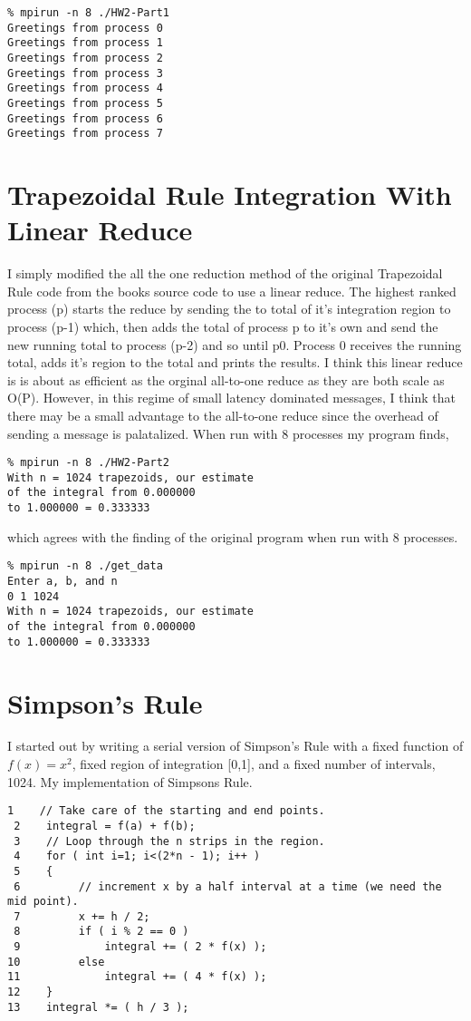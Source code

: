 \documentclass{IEEEtran}
\begin{document}
\begin{verbatim}
% mpirun -n 8 ./HW2-Part1  
Greetings from process 0 
Greetings from process 1 
Greetings from process 2 
Greetings from process 3 
Greetings from process 4 
Greetings from process 5 
Greetings from process 6 
Greetings from process 7
\end{verbatim}

\section{Trapezoidal Rule Integration With Linear Reduce}
I simply modified the all the one reduction method of the original Trapezoidal Rule code from the books source code to use a linear reduce. The highest ranked process (p) starts the reduce by sending the to total of it’s integration region to process (p-1) which, then adds the total of process p to it’s own and send the new running total to process (p-2) and so until p0. Process 0 receives the running total, adds it’s region to the total and prints the results. I think this linear reduce is is about as efficient as the orginal all-to-one reduce as they are both scale as O(P). However, in this regime of small latency dominated messages, I think that there may be a small advantage to the all-to-one reduce since the overhead of sending a message is palatalized. When run with 8 processes my program finds,

\begin{verbatim}
% mpirun -n 8 ./HW2-Part2 
With n = 1024 trapezoids, our estimate 
of the integral from 0.000000 
to 1.000000 = 0.333333
\end{verbatim}

which agrees with the finding of the original program when run with 8 processes.

\begin{verbatim}
% mpirun -n 8 ./get_data  
Enter a, b, and n 
0 1 1024 
With n = 1024 trapezoids, our estimate 
of the integral from 0.000000 
to 1.000000 = 0.333333
\end{verbatim}

\section{Simpson's Rule}
I started out by writing a serial version of Simpson’s Rule with a fixed function of $f(x) = x^{2}$, fixed region of integration [0,1], and a fixed number of intervals, 1024.  My implementation of Simpsons Rule.

\begin{verbatim}
1    // Take care of the starting and end points. 
 2    integral = f(a) + f(b); 
 3    // Loop through the n strips in the region. 
 4    for ( int i=1; i<(2*n - 1); i++ ) 
 5    { 
 6         // increment x by a half interval at a time (we need the mid point).
 7         x += h / 2; 
 8         if ( i % 2 == 0 ) 
 9             integral += ( 2 * f(x) ); 
10         else  
11             integral += ( 4 * f(x) ); 
12    } 
13    integral *= ( h / 3 );
\end{verbatim}
\end{document}
